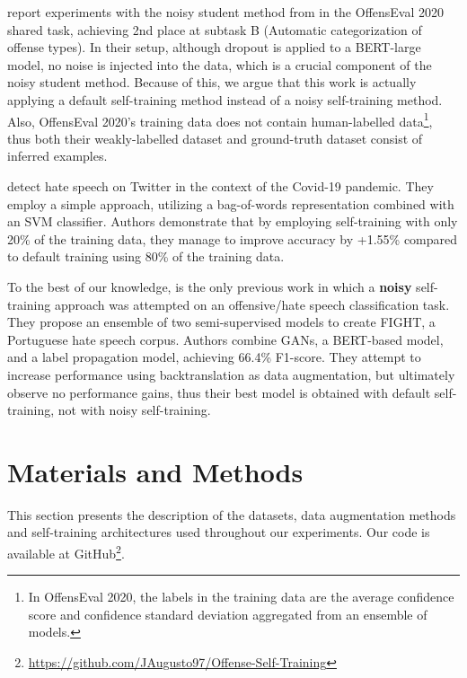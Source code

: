 \documentclass[11pt,a4paper]{article}
\begin{document}
\citet{pham-hong-chokshi-2020-pgsg} report experiments with the noisy student method from \citet{noisystudent} in the OffensEval 2020 shared task, achieving 2nd place at subtask B (Automatic categorization of offense types).
In their setup, although dropout is applied to a BERT-large model, no noise is injected into the data, which is a crucial component of the noisy student method. Because of this, we argue that this work is actually applying a default self-training method instead of a noisy self-training method. Also, OffensEval 2020's training data does not contain human-labelled data\footnote{In OffensEval 2020, the labels in the training data are the average confidence score and confidence standard deviation aggregated from an ensemble of models.}, thus both their weakly-labelled dataset and ground-truth dataset consist of inferred examples.

\citet{richardson2022semi} detect hate speech on Twitter in the context of the Covid-19 pandemic. They employ a simple approach, utilizing a bag-of-words representation combined with an SVM classifier. Authors demonstrate that by employing self-training with only 20\% of the training data, they manage to improve accuracy by +1.55\% compared to default training using 80\% of the training data.

To the best of our knowledge, \citet{santos_et_al:OASIcs.SLATE.2022.11} is the only previous work in which a \textbf{noisy} self-training approach was attempted on an offensive/hate speech classification task. They propose an ensemble of two semi-supervised models to create FIGHT, a Portuguese hate speech corpus. Authors combine GANs, a BERT-based model, and a label propagation model, achieving 66.4\% F1-score. They attempt to increase performance using backtranslation as data augmentation, but ultimately observe no performance gains, thus their best model is obtained with default self-training, not with noisy self-training. 



\section{Materials and Methods} \label{sec:experimental-setup}
This section presents the description of the datasets, data augmentation methods and self-training architectures used throughout our experiments. Our code is available at GitHub\footnote{\url{https://github.com/JAugusto97/Offense-Self-Training}}.
\end{document}
